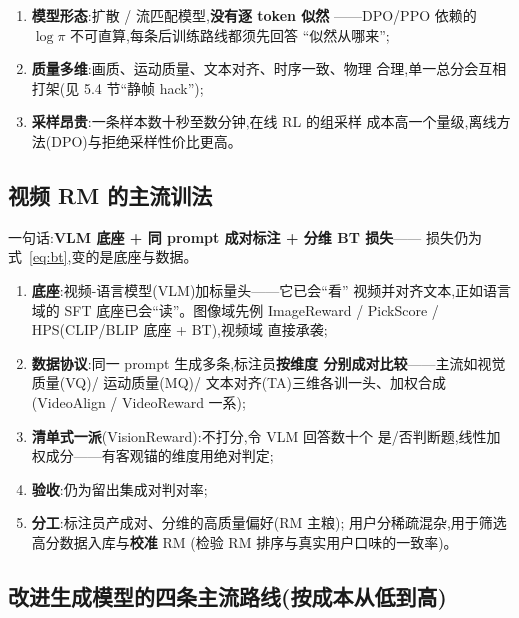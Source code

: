 \documentclass[UTF8, 11pt]{ctexart}
\begin{document}
\begin{enumerate}
  \item \textbf{模型形态}:扩散 / 流匹配模型,\textbf{没有逐 token 似然}
        ——DPO/PPO 依赖的 $\log\pi$ 不可直算,每条后训练路线都须先回答
        ``似然从哪来'';
  \item \textbf{质量多维}:画质、运动质量、文本对齐、时序一致、物理
        合理,单一总分会互相打架(见 5.4 节``静帧 hack'');
  \item \textbf{采样昂贵}:一条样本数十秒至数分钟,在线 RL 的组采样
        成本高一个量级,离线方法(DPO)与拒绝采样性价比更高。
\end{enumerate}

\subsection{视频 RM 的主流训法}

一句话:\textbf{VLM 底座 + 同 prompt 成对标注 + 分维 BT 损失}——
损失仍为式~\eqref{eq:bt},变的是底座与数据。

\begin{enumerate}
  \item \textbf{底座}:视频-语言模型(VLM)加标量头——它已会``看''
        视频并对齐文本,正如语言域的 SFT 底座已会``读''。图像域先例
        ImageReward / PickScore / HPS(CLIP/BLIP 底座 + BT),视频域
        直接承袭;
  \item \textbf{数据协议}:同一 prompt 生成多条,标注员\textbf{按维度
        分别成对比较}——主流如视觉质量(VQ)/ 运动质量(MQ)/
        文本对齐(TA)三维各训一头、加权合成(VideoAlign /
        VideoReward 一系);
  \item \textbf{清单式一派}(VisionReward):不打分,令 VLM 回答数十个
        是/否判断题,线性加权成分——有客观锚的维度用绝对判定;
  \item \textbf{验收}:仍为留出集成对判对率;
  \item \textbf{分工}:标注员产成对、分维的高质量偏好(RM 主粮);
        用户分稀疏混杂,用于筛选高分数据入库与\textbf{校准} RM
        (检验 RM 排序与真实用户口味的一致率)。
\end{enumerate}

\subsection{改进生成模型的四条主流路线(按成本从低到高)}
\end{document}
